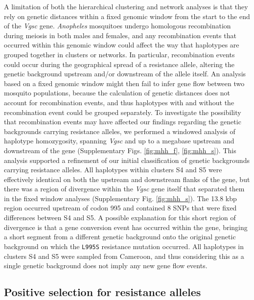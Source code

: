 \documentclass[a4paper,11pt,abstracton,hidelinks]{scrartcl}
\begin{document}
%
A limitation of both the hierarchical clustering and network analyses is that they rely on genetic distances within a fixed genomic window from the start to the end of the \textit{Vgsc} gene.
%
\textit{Anopheles} mosquitoes undergo homologous recombination during meiosis in both males and females, and any recombination events that occurred within this genomic window could affect the way that haplotypes are grouped together in clusters or networks.
%
In particular, recombination events could occur during the geographical spread of a resistance allele, altering the genetic background upstream and/or downstream of the allele itself.
%
An analysis based on a fixed genomic window might then fail to infer gene flow between two mosquito populations, because the calculation of genetic distances does not account for recombination events, and thus haplotypes with and without the recombination event could be grouped separately.
%
To investigate the possibility that recombination events may have affected our findings regarding the genetic backgrounds carrying resistance alleles, we performed a windowed analysis of haplotype homozygosity, spanning \textit{Vgsc} and up to a megabase upstream and downstream of the gene (Supplementary Figs. \ref{fig:mhh_f}, \ref{fig:mhh_s}).
%
This analysis supported a refinement of our initial classification of genetic backgrounds carrying resistance alleles.
%
All haplotypes within clusters S4 and S5 were effectively identical on both the upstream and downstream flanks of the gene, but there was a region of divergence within the \textit{Vgsc} gene itself that separated them in the fixed window analyses (Supplementary Fig. \ref{fig:mhh_s}).
%
The 13.8 kbp region occurred upstream of codon 995 and contained 8 SNPs that were fixed differences between S4 and S5. 
%
A possible explanation for this short region of divergence is that a gene conversion event has occurred within the gene, bringing a short segment from a different genetic background onto the original genetic background on which the \texttt{L995S} resistance mutation occurred.
%
All haplotypes in clusters S4 and S5 were sampled from Cameroon, and thus considering this as a single genetic background does not imply any new gene flow events.
%


\subsection*{Positive selection for resistance alleles}
\end{document}
